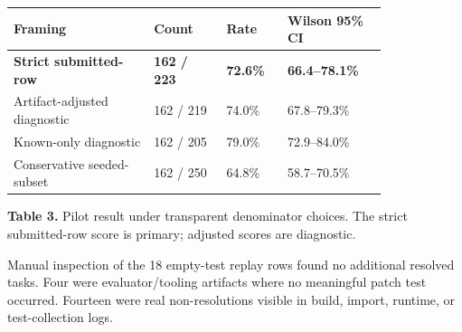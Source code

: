 \documentclass[11pt]{article}
\begin{document}
\begin{center}
\begin{tabular}{p{0.31\linewidth}p{0.16\linewidth}p{0.13\linewidth}p{0.22\linewidth}}
\toprule
Framing & Count & Rate & Wilson 95\% CI \\
\midrule
\textbf{Strict submitted-row} & \textbf{162 / 223} & \textbf{72.6\%} & \textbf{66.4--78.1\%} \\
Artifact-adjusted diagnostic & 162 / 219 & 74.0\% & 67.8--79.3\% \\
Known-only diagnostic & 162 / 205 & 79.0\% & 72.9--84.0\% \\
Conservative seeded-subset & 162 / 250 & 64.8\% & 58.7--70.5\% \\
\bottomrule
\end{tabular}
\par\vspace{0.5em}
\small\textbf{Table 3.} Pilot result under transparent denominator choices. The strict submitted-row score is primary; adjusted scores are diagnostic.
\end{center}

Manual inspection of the 18 empty-test replay rows found no additional resolved tasks. Four were evaluator/tooling artifacts where no meaningful patch test occurred. Fourteen were real non-resolutions visible in build, import, runtime, or test-collection logs.
\end{document}
